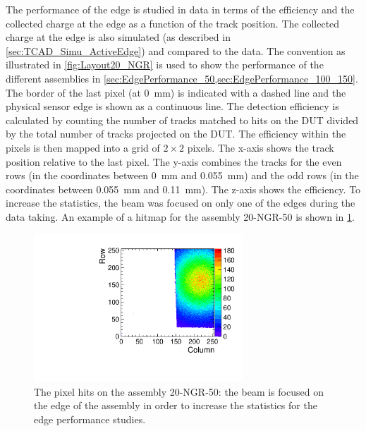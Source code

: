 The performance of the edge is studied in data in terms of the
efficiency and the collected charge at the edge as a function of the
track position. The collected charge at the edge is also simulated (as
described in \cref{sec:TCAD_Simu_ActiveEdge}) and compared to the
data. The convention as illustrated in \cref{fig:Layout20_NGR} is used
to show the performance of the different assemblies in
\cref{sec:EdgePerformance_50,sec:EdgePerformance_100_150}. The border
of the last pixel (at 0~mm) is indicated with a dashed line and the
physical sensor edge is shown as a continuous line. The detection
efficiency is calculated by counting the number of tracks matched to
hits on the DUT divided by the total number of tracks projected on the
DUT. The efficiency within the pixels is then mapped into a grid of
$2\times2$ pixels. The x-axis shows the track position relative to the
last pixel. The y-axis combines the tracks for the even rows (in the
coordinates between 0~mm and 0.055~mm) and the odd rows (in the
coordinates between 0.055~mm and 0.11~mm). The z-axis shows the
efficiency. To increase the statistics, the beam was focused on only
one of the edges during the data taking. An example of a hitmap for
the assembly 20-NGR-50 is shown in \cref{fig:hitMapW19G7}.

\begin{figure}[htbp]
  \centering
  \includegraphics[width=0.7\textwidth]{figures/ActiveEdge/hitMap_W19_G7.pdf}
  \caption{The pixel hits on the assembly 20-NGR-50: the beam is
    focused on the edge of the assembly in order to increase the
    statistics for the edge performance studies.}
  \label{fig:hitMapW19G7}
\end{figure}


